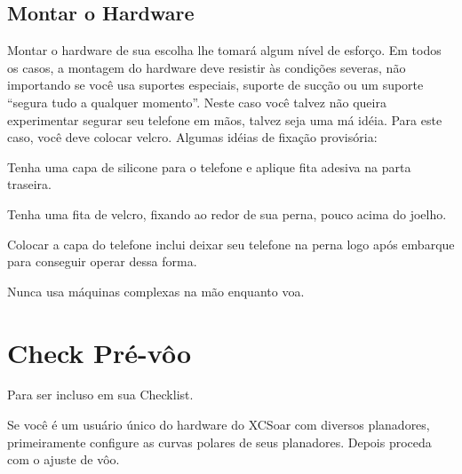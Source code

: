 \documentclass[a4paper,12pt,utf8]{scrreprt}
\begin{document}
\subsection{\textcolor{flashblue}{Montar o Hardware}}
Montar o hardware de sua escolha lhe tomará algum nível de esforço.  Em todos os casos, a montagem do hardware deve resistir às condições severas, não importando se você usa suportes especiais, suporte de sucção ou um suporte “segura tudo a qualquer momento”.  Neste caso você talvez não queira experimentar segurar seu telefone em mãos, talvez seja uma má idéia.  Para este caso, você deve colocar velcro.  Algumas idéias de fixação provisória:
\begin{compactitem}
\item Tenha uma capa de silicone para o telefone e aplique fita adesiva na parta traseira.
\item Tenha uma fita de velcro, fixando ao redor de sua perna, pouco acima do joelho.
\item Colocar a capa do telefone inclui deixar seu telefone na perna logo após embarque para conseguir operar dessa forma.
\end{compactitem}
Nunca usa máquinas complexas na mão enquanto voa. 

\newpage
\section{Check Pré-vôo}


Para ser incluso em sua Checklist.

Se você é um usuário único do hardware do XCSoar com diversos planadores, primeiramente configure as curvas polares de seus planadores.  Depois proceda com o ajuste de vôo.
\end{document}
